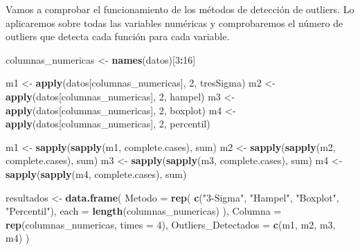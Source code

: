 \documentclass[notspecified,article,submit,moreauthors,pdftex]{Definitions/mdpi}
\newenvironment{Shaded}{\begin{snugshade}}{\end{snugshade}}
\newcommand{\AttributeTok}[1]{\textcolor[rgb]{0.13,0.29,0.53}{#1}}
\newcommand{\DecValTok}[1]{\textcolor[rgb]{0.00,0.00,0.81}{#1}}
\newcommand{\FunctionTok}[1]{\textcolor[rgb]{0.13,0.29,0.53}{\textbf{#1}}}
\newcommand{\NormalTok}[1]{#1}
\newcommand{\OtherTok}[1]{\textcolor[rgb]{0.56,0.35,0.01}{#1}}
\newcommand{\SpecialCharTok}[1]{\textcolor[rgb]{0.81,0.36,0.00}{\textbf{#1}}}
\newcommand{\StringTok}[1]{\textcolor[rgb]{0.31,0.60,0.02}{#1}}
\begin{document}
Vamos a comprobar el funcionamiento de los métodos de detección de
outliers. Lo aplicaremos sobre todas las variables numéricas y
comprobaremos el número de outliers que detecta cada función para cada
variable.

\begin{Shaded}
\begin{Highlighting}[]
\NormalTok{columnas\_numericas }\OtherTok{\textless{}{-}} \FunctionTok{names}\NormalTok{(datos)[}\DecValTok{3}\SpecialCharTok{:}\DecValTok{16}\NormalTok{]}

\NormalTok{m1 }\OtherTok{\textless{}{-}} \FunctionTok{apply}\NormalTok{(datos[columnas\_numericas], }\DecValTok{2}\NormalTok{, tresSigma)}
\NormalTok{m2 }\OtherTok{\textless{}{-}} \FunctionTok{apply}\NormalTok{(datos[columnas\_numericas], }\DecValTok{2}\NormalTok{, hampel)}
\NormalTok{m3 }\OtherTok{\textless{}{-}} \FunctionTok{apply}\NormalTok{(datos[columnas\_numericas], }\DecValTok{2}\NormalTok{, boxplot)}
\NormalTok{m4 }\OtherTok{\textless{}{-}} \FunctionTok{apply}\NormalTok{(datos[columnas\_numericas], }\DecValTok{2}\NormalTok{, percentil)}

\NormalTok{m1 }\OtherTok{\textless{}{-}} \FunctionTok{sapply}\NormalTok{(}\FunctionTok{sapply}\NormalTok{(m1, complete.cases), sum)}
\NormalTok{m2 }\OtherTok{\textless{}{-}} \FunctionTok{sapply}\NormalTok{(}\FunctionTok{sapply}\NormalTok{(m2, complete.cases), sum)}
\NormalTok{m3 }\OtherTok{\textless{}{-}} \FunctionTok{sapply}\NormalTok{(}\FunctionTok{sapply}\NormalTok{(m3, complete.cases), sum)}
\NormalTok{m4 }\OtherTok{\textless{}{-}} \FunctionTok{sapply}\NormalTok{(}\FunctionTok{sapply}\NormalTok{(m4, complete.cases), sum)}

\NormalTok{resultados }\OtherTok{\textless{}{-}} \FunctionTok{data.frame}\NormalTok{(}
  \AttributeTok{Metodo =} \FunctionTok{rep}\NormalTok{(}
    \FunctionTok{c}\NormalTok{(}\StringTok{"3{-}Sigma"}\NormalTok{, }\StringTok{"Hampel"}\NormalTok{, }\StringTok{"Boxplot"}\NormalTok{, }\StringTok{"Percentil"}\NormalTok{),}
    \AttributeTok{each =} \FunctionTok{length}\NormalTok{(columnas\_numericas)}
\NormalTok{  ),}
  \AttributeTok{Columna =} \FunctionTok{rep}\NormalTok{(columnas\_numericas, }\AttributeTok{times =} \DecValTok{4}\NormalTok{),}
  \AttributeTok{Outliers\_Detectados =} \FunctionTok{c}\NormalTok{(m1, m2, m3, m4)}
\NormalTok{)}


\end{Highlighting}
\end{Shaded}
\end{document}
